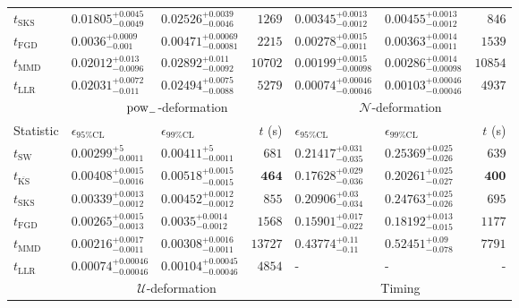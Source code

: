 \begin{tabular}{l|llr|llr}
	$t_{\mathrm{SKS}}$ & $0.01805_{-0.0049}^{+0.0045}$ & $0.02526_{-0.0046}^{+0.0039}$ & $1269$ & $0.00345_{-0.0012}^{+0.0013}$ & $0.00455_{-0.0012}^{+0.0013}$ & $846$ \\
	$t_{\mathrm{FGD}}$ & ${\mathbf{0.0036_{-0.001}^{+0.0009}}}$ & ${\mathbf{0.00471_{-0.00081}^{+0.00069}}}$ & $2215$ & $0.00278_{-0.0011}^{+0.0015}$ & $0.00363_{-0.0011}^{+0.0014}$ & $1539$ \\
	$t_{\mathrm{MMD}}$ & $0.02012_{-0.0096}^{+0.013}$ & $0.02892_{-0.0092}^{+0.011}$ & $10702$ & ${\mathbf{0.00199_{-0.00098}^{+0.0015}}}$ & ${\mathbf{0.00286_{-0.00098}^{+0.0014}}}$ & $10854$ \\
	$t_{\mathrm{LLR}}$ & $0.02031_{-0.011}^{+0.0072}$ & $0.02494_{-0.0088}^{+0.0075}$ & $5279$ & $0.00074_{-0.00046}^{+0.00046}$ & $0.00103_{-0.00046}^{+0.00046}$ & $4937$ \\
	\toprule
	\multicolumn{1}{c}{} & \multicolumn{3}{c}{$\rm{pow}_{-}$-deformation} & \multicolumn{3}{c}{$\mathcal{N}$-deformation} \\
	Statistic & $\epsilon_{95\%\mathrm{CL}}$ & $\epsilon_{99\%\mathrm{CL}}$ & $t$ (s) & $\epsilon_{95\%\mathrm{CL}}$ & $\epsilon_{99\%\mathrm{CL}}$ & $t$ (s) \\
	\midrule
	$t_{\mathrm{SW}}$ & $0.00299_{-0.0011}^{+5}$ & $0.00411_{-0.0011}^{+5}$ & $681$ & $0.21417_{-0.035}^{+0.031}$ & $0.25369_{-0.026}^{+0.025}$ & $639$ \\
	$t_{\overline{\mathrm{KS}}}$ & $0.00408_{-0.0016}^{+0.0015}$ & $0.00518_{-0.0015}^{+0.0015}$ & ${\mathbf{464}}$ & $0.17628_{-0.036}^{+0.029}$ & $0.20261_{-0.027}^{+0.025}$ & ${\mathbf{400}}$ \\
	$t_{\mathrm{SKS}}$ & $0.00339_{-0.0012}^{+0.0013}$ & $0.00452_{-0.0012}^{+0.0012}$ & $855$ & $0.20906_{-0.034}^{+0.03}$ & $0.24763_{-0.026}^{+0.025}$ & $695$ \\
	$t_{\mathrm{FGD}}$ & $0.00265_{-0.0013}^{+0.0015}$ & $0.0035_{-0.0012}^{+0.0014}$ & $1568$ & ${\mathbf{0.15901_{-0.022}^{+0.017}}}$ & ${\mathbf{0.18192_{-0.015}^{+0.013}}}$ & $1177$ \\
	$t_{\mathrm{MMD}}$ & ${\mathbf{0.00216_{-0.0011}^{+0.0017}}}$ & ${\mathbf{0.00308_{-0.0011}^{+0.0016}}}$ & $13727$ & $0.43774_{-0.11}^{+0.11}$ & $0.52451_{-0.078}^{+0.09}$ & $7791$ \\
	$t_{\mathrm{LLR}}$ & $0.00074_{-0.00046}^{+0.00046}$ & $0.00104_{-0.00046}^{+0.00045}$ & $4854$ & - & - & - \\
	\toprule
	\multicolumn{1}{c}{} & \multicolumn{3}{c}{$\mathcal{U}$-deformation} & \multicolumn{3}{c}{Timing} \\

\end{tabular}
